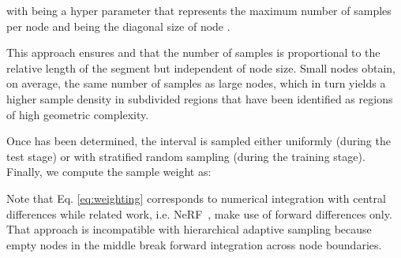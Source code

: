 \documentclass[acmtog,nonacm]{acmart} \acmSubmissionID{0438}
\begin{document}
with  being a hyper parameter that represents the maximum number of
samples per node and  being the diagonal size of node .

This approach ensures  and that the number of samples is proportional to the relative length of the segment but independent of node size.
Small nodes obtain, on average, the same number of samples as large nodes, which in turn yields a higher sample density in subdivided regions that have been identified as regions of high geometric complexity.

Once  has been determined, the interval is sampled either uniformly
(during the test stage) or with stratified random sampling (during the
training stage).  Finally, we compute the sample weight  as:

Note that Eq. \eqref{eq:weighting} corresponds to numerical integration with central differences while related work, i.e. NeRF~\cite{mildenhall2020nerf}, make use of forward differences only. 
That approach is incompatible with hierarchical adaptive sampling because empty nodes in the middle break forward integration across node boundaries.
\end{document}

